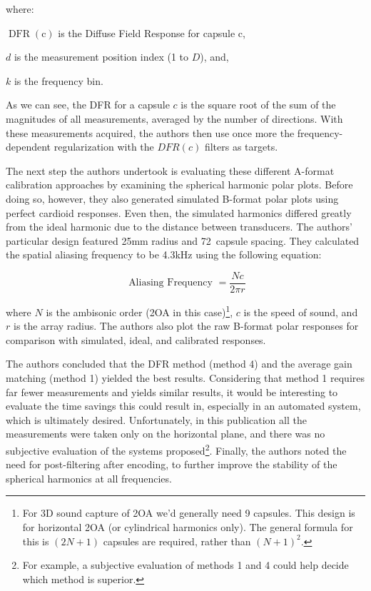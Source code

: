 
\noindent where:
 
\begin{description}
\item  $\operatorname{DFR}(\mathrm{c})$ is the Diffuse Field Response for capsule $\mathrm{c}$,
\item $d$ is the measurement position index (1 to $D$), and,
\item $k$ is the frequency bin.
\end{description}

As we can see, the DFR for a capsule $c$ is the square root of the sum of the magnitudes of all measurements, averaged by the number of directions. With these measurements acquired, the authors then use once more the frequency-dependent regularization with the $DFR(c)$ filters as targets.

The next step the authors undertook is evaluating these different A-format calibration approaches by examining the spherical harmonic polar plots. Before doing so, however, they also generated simulated B-format polar plots using perfect cardioid responses. Even then, the simulated harmonics differed greatly from the ideal harmonic due to the distance between transducers. The authors' particular design featured 25mm radius and 72\textdegree \ capsule spacing. They calculated the spatial aliasing frequency to be 4.3kHz using the following equation:

$$
\text { Aliasing Frequency }=\frac{N c}{2 \pi r}
$$

where $N$ is the ambisonic order (2OA in this case)\footnote{For 3D sound capture of 2OA we'd generally need 9 capsules. This design is for horizontal 2OA (or cylindrical harmonics only). The general formula for this is $(2N + 1)$ capsules are required, rather than $(N + 1)^2$.}, $c$ is the speed of sound, and $r$ is the array radius. The authors also plot the raw B-format polar responses for comparison with simulated, ideal, and calibrated responses.

The authors concluded that the DFR method (method 4) and the average gain matching (method 1) yielded the best results. Considering that method 1 requires far fewer measurements and yields similar results, it would be interesting to evaluate the time savings this could result in, especially in an automated system, which is ultimately desired. Unfortunately, in this publication all the measurements were taken only on the horizontal plane, and there was no subjective evaluation of the systems proposed\footnote{For example, a subjective evaluation of methods 1 and 4 could help decide which method is superior.}. Finally, the authors noted the need for post-filtering after encoding, to further improve the stability of the spherical harmonics at all frequencies.


